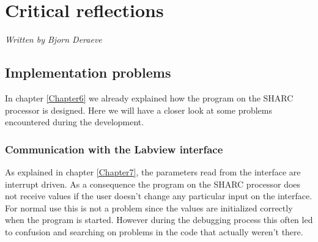 
\chapter{Critical reflections} 
\label{Chapter8}
\textsf{\textsl{Written by Bjorn Deraeve}}
\section{Implementation problems}
In chapter \ref{Chapter6} we already explained how the program on the SHARC processor is designed. Here we will have a closer look at some problems encountered during the development.
\subsection{Communication with the Labview interface}
As explained in chapter \ref{Chapter7}, the parameters read from the interface are interrupt driven. As a consequence the program on the SHARC processor does not receive values if the user doesn't change any particular input on the interface.\\
For normal use this is not a problem since the values are initialized correctly when the program is started. However during the debugging process this often led to confusion and searching on problems in the code that actually weren't there.
